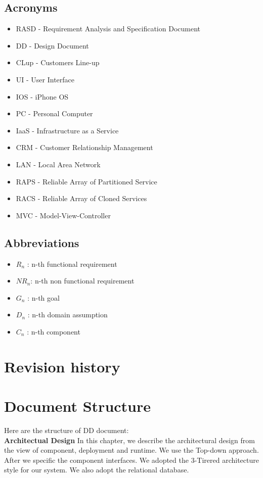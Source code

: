 \documentclass[a4paper,12pt]{report}
\begin{document}
\subsection{Acronyms}
\begin{itemize}
	\item RASD - Requirement Analysis and Specification Document
	\item DD - Design Document
	\item CLup - Customers Line-up
	\item UI - User Interface
	\item IOS - iPhone OS
	\item PC - Personal Computer
	\item IaaS - Infrastructure as a Service %
	\item CRM - Customer Relationship Management
	\item LAN - Local Area Network
	\item RAPS - Reliable Array of Partitioned Service
	\item RACS - Reliable Array of Cloned Services
	\item MVC - Model-View-Controller
\end{itemize}


\subsection{Abbreviations}
\begin{itemize}
	\item  $R_n$ : n-th functional requirement
	\item  $NR_n$: n-th non functional requirement
	\item  $G_n$ : n-th goal
	\item  $D_n$ : n-th domain assumption
	\item  $C_n$ : n-th component
\end{itemize}


\section{Revision history}


\section{Document Structure}
Here are the structure of DD document:~\\

\textbf{Architectual Design}
In this chapter, we describe the architectural design from the view of component, deployment and runtime. We use the Top-down approach. After we specific the component interfaces. We adopted the 3-Tirered architecture style for our system. We also adopt the relational database.~\\
\end{document}
